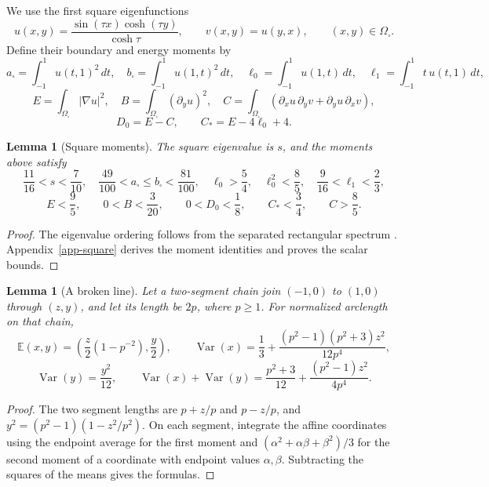 \documentclass[11pt]{amsart}
\newtheorem{lemma}[theorem]{Lemma}
\theoremstyle{remark}\newtheorem{remark}[theorem]{Remark}
\numberwithin{equation}{section}
\begin{document}
We use the first square eigenfunctions
\[
u(x,y)=\frac{\sin(\tau x)\cosh(\tau y)}{\cosh\tau},\qquad
v(x,y)=u(y,x),\qquad (x,y)\in\Omega_\square.
\]
Define their boundary and energy moments by
\[
a_\square=\int_{-1}^1u(t,1)^2\,dt,\quad
b_\square=\int_{-1}^1u(1,t)^2\,dt,\quad
\ell_0=\int_{-1}^1u(1,t)\,dt,\quad
\ell_1=\int_{-1}^1t\,u(t,1)\,dt,
\]
\[
E=\int_{\Omega_\square}|\nabla u|^2,\quad
B=\int_{\Omega_\square}(\partial_yu)^2,\quad
C=\int_{\Omega_\square}
(\partial_xu\,\partial_yv+\partial_yu\,\partial_xv),
\]
\[
D_0=E-C,\qquad C_*=E-4\ell_0+4.
\]

\begin{lemma}[Square moments]\label{lem-square-model-bounds}
The square eigenvalue is $s$, and the moments above satisfy
\[
\frac{11}{16}<s<\frac7{10},\quad
\frac{49}{100}<a_\square\le b_\square<\frac{81}{100},\quad
\ell_0>\frac54,\quad \ell_0^2<\frac85,\quad
\frac9{16}<\ell_1<\frac23,
\]
\[
E<\frac95,\qquad 0<B<\frac3{20},\qquad
0<D_0<\frac18,\qquad C_*<\frac34,\qquad C>\frac85.
\]
\end{lemma}
\begin{proof}
The eigenvalue ordering follows from the separated rectangular spectrum
\cite{Tan2017,GirouardEtAl2019}. Appendix~\ref{app-square} derives the moment identities and proves the
scalar bounds.
\end{proof}

\begin{lemma}[A broken line]\label{lem-broken-line}
Let a two-segment chain join $(-1,0)$ to $(1,0)$ through $(z,y)$, and let
its length be $2p$, where $p\ge1$. For normalized arclength on that chain,
\[
\mathbb E(x,y)=\left(\frac z2(1-p^{-2}),\frac y2\right),
\qquad
\operatorname{Var}(x)=\frac13+
\frac{(p^2-1)(p^2+3)z^2}{12p^4},
\]
\[
\operatorname{Var}(y)=\frac{y^2}{12},\qquad
\operatorname{Var}(x)+\operatorname{Var}(y)
=\frac{p^2+3}{12}+\frac{(p^2-1)z^2}{4p^4}.
\]
\end{lemma}
\begin{proof}
The two segment lengths are $p+z/p$ and $p-z/p$, and
$y^2=(p^2-1)(1-z^2/p^2)$. On each segment, integrate the affine coordinates using the endpoint
average for the first moment and
$(\alpha^2+\alpha\beta+\beta^2)/3$ for the second moment of a coordinate
with endpoint values $\alpha,\beta$. Subtracting the squares of the means
gives the formulas.
\end{proof}
\end{document}
